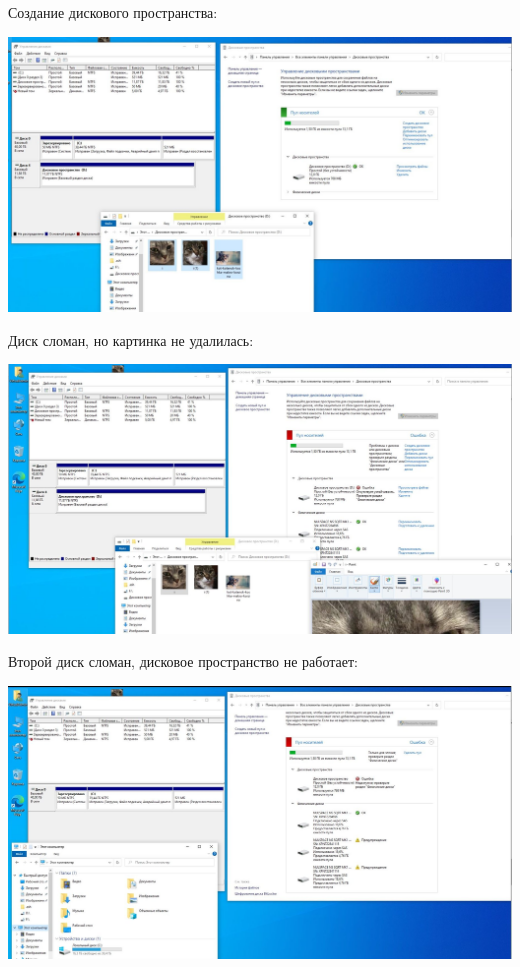 \documentclass[a4paper,14pt]{extarticle}
\begin{document}
\begin{enumerate}
		Создание дискового пространства:
		\begin{center}
			\includegraphics[width=\textwidth]{9}
		\end{center}
		
		\newpage
		Диск сломан, но картинка не удалилась:
		\begin{center}
			\includegraphics[width=\textwidth]{10}
		\end{center}
	
		Второй диск сломан, дисковое пространство не работает:
		\begin{center}
			\includegraphics[width=\textwidth]{11}
		\end{center}
		

\end{enumerate}
\end{document}
